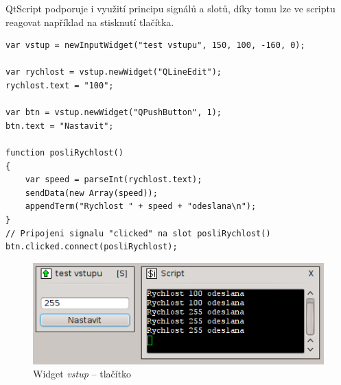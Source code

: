 \documentclass[12pt, a4paper, oneside]{article}
\newcommand{\It}{\textit}  %
\begin{document}
\newpage
QtScript podporuje i využití principu signálů a slotů, díky tomu lze ve scriptu reagovat například na stisknutí tlačítka.

\noindent\begin{minipage}{\textwidth}
\begin{lstlisting}[caption=Widget \It{vstup} -- tlačítko]
var vstup = newInputWidget("test vstupu", 150, 100, -160, 0);

var rychlost = vstup.newWidget("QLineEdit");
rychlost.text = "100";

var btn = vstup.newWidget("QPushButton", 1);
btn.text = "Nastavit";

function posliRychlost()
{
    var speed = parseInt(rychlost.text);
    sendData(new Array(speed));
    appendTerm("Rychlost " + speed + "odeslana\n");
}
// Pripojeni signalu "clicked" na slot posliRychlost()
btn.clicked.connect(posliRychlost);
\end{lstlisting}
\end{minipage}

\begin{figure}[H]
\begin{center}
\includegraphics{img/ref_input2.png}
\caption{Widget \It{vstup} -- tlačítko}
\end{center}
\end{figure}
\end{document}
